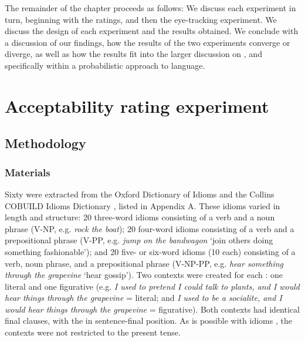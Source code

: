 \documentclass[output=paper
,modfonts
,nonflat]{langsci/langscibook}
\begin{document}
The remainder of the chapter proceeds as follows: We discuss each experiment in turn, beginning with the  ratings, and then the eye-tracking experiment. We discuss the design of each experiment and the results obtained. We conclude with a discussion of our findings, how the results of the two experiments converge or diverge,  as well as how the results fit into the larger discussion on , and specifically within a probabilistic approach to language.




\section{Acceptability rating experiment}

\subsection{Methodology}
\subsubsection{Materials}

Sixty  were extracted from the Oxford Dictionary of  Idioms \citep{OxfordIdiomsDictionary} and the Collins COBUILD Idioms Dictionary \citep{CollinsIdiomsDictionary}, listed in Appendix A. These idioms varied in length and  structure: 20 three-word idioms consisting of a verb and a noun phrase (V-NP, e.g. \textit{rock the boat}); 20 four-word idioms consisting of a verb and a prepositional phrase (V-PP, e.g. \textit{jump on the bandwagon} `join others doing something fashionable'); and 20 five- or six-word idioms (10 each) consisting of a verb, noun phrase, and a prepositional phrase (V-NP-PP, e.g. \textit{hear something through the grapevine} `hear gossip'). Two contexts were created for each : one literal  and one figurative (e.g. \textit {I used to pretend I could talk to plants, and I would hear things through the grapevine} = literal; and \textit {I used to be a socialite, and I would hear things through the grapevine} = figurative). Both contexts had identical final clauses, with the  in sentence-final position. As  is possible with idioms \citep{Moon1998, Schroder2013}, the contexts were not restricted to the present tense.
\end{document}

